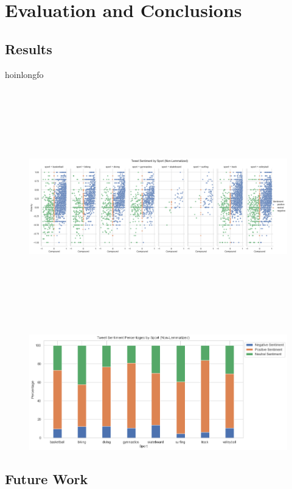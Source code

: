 \documentclass[12pt]{article}
\begin{document}
    \section{Evaluation and Conclusions}
        \subsection{Results}
            hoinlongfo
        \begin{figure}[H]
            \includegraphics[height = 4in, width=8.5in, angle =90]{Sentiment.png}
        \end{figure}


        \begin{figure}[H]
            \includegraphics[scale=0.5]{bar.png}
        \end{figure}

        \subsection{Future Work}
\end{document}
